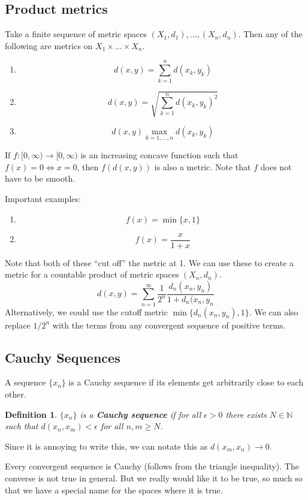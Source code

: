 \documentclass[10pt]{article}         %
\newtheorem{definition}{Definition}[section]
\theoremstyle{remark}
\newcommand{\N}{\mathbb{N}}
\begin{document}
\subsection{Product metrics}

Take a finite sequence of metric spaces $(X_1, d_1), \dots, (X_n, d_n)$. Then any of the following are metrics on $X_1 \times \dots \times X_n$.
\begin{enumerate}
    \item \[ d(x, y) = \sum_{k=1}^n d(x_k, y_k) \]
    \item \[ d(x, y) = \sqrt{ \sum_{k=1}^n d(x_k, y_k)^2  }\]
    \item \[ d(x,y) \max_{k = 1, \dots, n} d(x_k, y_k) \]
\end{enumerate}

If $f:[0, \infty) \rightarrow [0, \infty)$ is an increasing concave function such that $f(x)=0 \iff x=0$, then $f(d(x,y))$ is also a metric. Note that $f$ does not have to be smooth.

Important examples:
\begin{enumerate}
    \item \[ f(x) = \min\{x, 1\} \]
    \item \[ f(x) = \frac{x}{1+x} \]
\end{enumerate}
Note that both of these ``cut off'' the metric at 1. We can use these to create a metric for a countable product of metric spaces $(X_n, d_n)$.
\[
d(x,y) = \sum_{n = 1}^\infty \frac{1}{2^n} \frac{d_n(x_n, y_n)}{1+d_n(x_n, y_n}
\]
Alternatively, we could use the cutoff metric $\min\{d_n(x_n, y_n), 1\}$. We can also replace $1/2^n$ with the terms from any convergent sequence of positive terms.

\subsection{Cauchy Sequences}

A sequence $\{x_n\}$ is a Cauchy sequence if its elements get arbitrarily close to each other.

\begin{definition}
$\{x_n\}$ is a \textbf{Cauchy sequence} if for all $\epsilon >0$  there exists $N \in \N$ such that  $d(x_n, x_m) < \epsilon$ for all $n,m \geq N$.
\end{definition}

Since it is annoying to write this, we can notate this as $d(x_m, x_n) \rightarrow 0$.

Every convergent sequence is Cauchy (follows from the triangle inequality). The converse is not true in general. But we really would like it to be true, so much so that we have a special name for the spaces where it is true.
\end{document}
